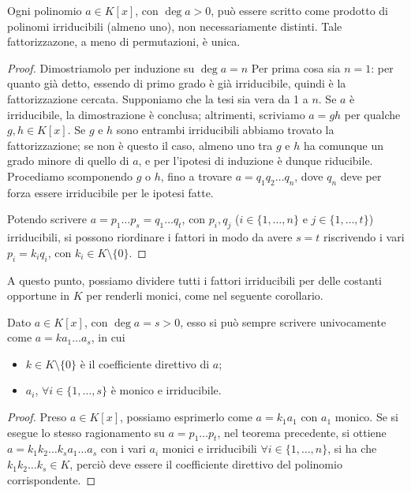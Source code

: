 \begin{teorema} \label{t:fattorizzazione-unica}
	Ogni polinomio $a\in K[x]$, con $\deg a>0$, può essere scritto come prodotto di polinomi irriducibili (almeno uno), non necessariamente distinti.
	Tale fattorizzazone, a meno di permutazioni, è unica.
\end{teorema}
\begin{proof}
	Dimostriamolo per induzione su $\deg a=n$
	Per prima cosa sia $n=1$: per quanto già detto, essendo di primo grado è già irriducibile, quindi è la fattorizzazione cercata.
	Supponiamo che la tesi sia vera da 1 a $n$.
	Se $a$ è irriducibile, la dimostrazione è conclusa; altrimenti, scriviamo $a=gh$ per qualche $g,h\in K[x]$.
	Se $g$ e $h$ sono entrambi irriducibili abbiamo trovato la fattorizzazione; se non è questo il caso, almeno uno tra $g$ e $h$ ha comunque un grado minore di quello di $a$, e per l'ipotesi di induzione è dunque riducibile.
	Procediamo scomponendo $g$ o $h$, fino a trovare $a=q_1q_2\dots q_n$, dove $q_n$ deve per forza essere irriducibile per le ipotesi fatte.
	
	Potendo scrivere $a=p_1\dots p_s=q_1\dots q_t$, con $p_i,q_j$ ($i\in\{1,\dots,n\}$ e $j\in\{1,\dots,t\}$) irriducibili, si possono riordinare i fattori in modo da avere $s=t$ riscrivendo i vari $p_i=k_iq_i$, con $k_i\in K\setminus\{0\}$.
\end{proof}
A questo punto, possiamo dividere tutti i fattori irriducibili per delle costanti opportune in $K$ per renderli monici, come nel seguente corollario.
\begin{corollario} \label{c:fattorizzazione-polinomi-monici}
	Dato $a\in K[x]$, con $\deg a=s>0$, esso si può sempre scrivere univocamente come $a=ka_1\dots a_s$, in cui
	\begin{itemize}
		\item $k\in K\setminus\{0\}$ è il coefficiente direttivo di $a$;
		\item $a_i$, $\forall i\in\{1,\dots,s\}$ è monico e irriducibile.
	\end{itemize}
\end{corollario}
\begin{proof}
	Preso $a\in K[x]$, possiamo esprimerlo come $a=k_1a_1$ con $a_1$ monico.
	Se si esegue lo stesso ragionamento su $a=p_1\dots p_t$, nel teorema precedente, si ottiene $a=k_1k_2\dots k_sa_1\dots a_s$ con i vari $a_i$ monici e irriducibili $\forall i\in\{1,\dots,n\}$, si ha che $k_1k_2\dots k_s\in K$, perciò deve essere il coefficiente direttivo del polinomio corrispondente.
\end{proof}   

